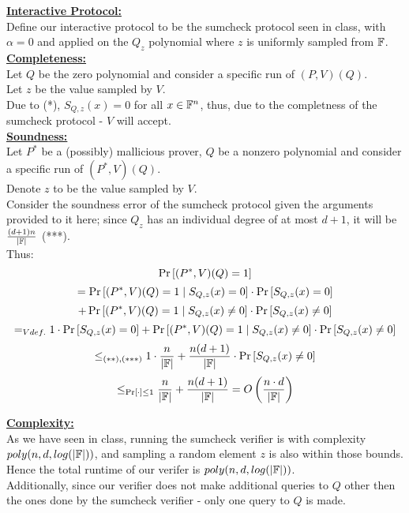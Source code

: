 \underline{\textbf{Interactive Protocol:}}\\
Define our interactive protocol to be the sumcheck
protocol seen in class, with $\alpha = 0$
and applied on the $Q_z$ polynomial where $z$ 
is uniformly sampled from $\mathbb{F}$.\\

\underline{\textbf{Completeness:}}\\
Let $Q$ be the zero polynomial and consider a specific run of $(P,V)(Q)$.\\
Let $z$ be the value sampled by $V$.\\
Due to (*), $S_{Q,z}(x)=0$ for all $x\in\mathbb{F}^n$,
thus, due to the completness of the sumcheck protocol -
$V$ will accept.\\

\underline{\textbf{Soundness:}}\\
Let $P^*$ be a (possibly) mallicious prover, $Q$ be a nonzero polynomial and consider a specific run of $(P^*,V)(Q)$.\\
Denote $z$ to be the value sampled by $V$.\\

Consider the soundness error of the sumcheck protocol
given the arguments provided to it here; since $Q_z$ has
an individual degree of at most $d+1$, it will be $\frac{(d+1)n}{|\mathbb{F}|}$ (***).\\

Thus:
\[
    \operatorname*{Pr}\left[(P^*,V)(Q)=1\right]
\]
\[
    =\operatorname*{Pr}\left[(P^*,V)(Q)=1\mid S_{Q,z}(x)=0\right]\cdot\operatorname*{Pr}\left[S_{Q,z}(x)=0\right]
\]
\[
    +\operatorname*{Pr}\left[(P^*,V)(Q)=1\mid S_{Q,z}(x)\neq 0\right]\cdot\operatorname*{Pr}\left[S_{Q,z}(x)\neq 0\right]
\]
\[
    =_{V def.}1\cdot\operatorname*{Pr}\left[S_{Q,z}(x)=0\right]
    +\operatorname*{Pr}\left[(P^*,V)(Q)=1\mid S_{Q,z}(x)\neq 0\right]\cdot\operatorname*{Pr}\left[S_{Q,z}(x)\neq 0\right]
\]
\[
    \leq_{(**),(***)}1\cdot\frac{n}{|\mathbb{F}|}
    +\frac{n(d+1)}{|\mathbb{F}|}\cdot \operatorname*{Pr}\left[S_{Q,z}(x)\neq 0\right]
\]
\[
    \leq_{\operatorname*{Pr}[\cdot]\leq 1}\frac{n}{|\mathbb{F}|}
    +\frac{n(d+1)}{|\mathbb{F}|}=O\left(\frac{n\cdot d}{|\mathbb{F}|}\right)
\]

\underline{\textbf{Complexity:}}\\
As we have seen in class, running the sumcheck verifier is with complexity
$poly(n,d,log(|\mathbb{F}|))$, and sampling a random element $z$
is also within those bounds. Hence the total runtime of our verifer 
is $poly(n,d,log(|\mathbb{F}|))$.\\

Additionally, since our verifier does not make additional queries to $Q$ other 
then the ones done by the sumcheck verifier - only one query to $Q$ is made.

